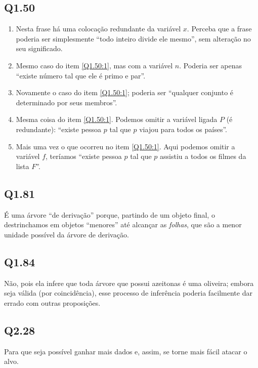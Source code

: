 \documentclass[portuguese,a4paper,12pt]{article}
\begin{document}
	\subsection*{Q1.50}
	
	\begin{enumerate}[label=(\arabic*)]
		\item \label{Q1.50:1} Nesta frase há uma colocação redundante da variável $x$. Perceba que a frase poderia ser simplesmente ``todo inteiro divide ele mesmo'', sem alteração no seu significado.
		\item Mesmo caso do item \ref{Q1.50:1}, mas com a variável $n$. Poderia ser apenas ``existe número tal que ele é primo e par''.
		\item Novamente o caso do item \ref{Q1.50:1}; poderia ser ``qualquer conjunto é determinado por seus membros''.
		\item Mesma coisa do item \ref{Q1.50:1}. Podemos omitir a variável ligada $P$ (é redundante): ``existe pessoa $p$ tal que $p$ viajou para todos os países''.
		\item Mais uma vez o que ocorreu no item \ref{Q1.50:1}. Aqui podemos omitir a variável $f$, teríamos ``existe pessoa $p$ tal que $p$ assistiu a todos os filmes da lista $F$''.
	\end{enumerate}
	
	\subsection*{Q1.81}
	
	É uma árvore ``de derivação'' porque, partindo de um objeto final, o destrinchamos em objetos ``menores'' até alcançar as \textit{folhas}, que são a menor unidade possível da árvore de derivação.
	
	\subsection*{Q1.84}
	
	Não, pois ela infere que toda árvore que possui azeitonas é uma oliveira; embora seja válida (por coincidência), esse processo de inferência poderia facilmente dar errado com outras proposições.
	
	\subsection*{Q2.28}
	
	Para que seja possível ganhar mais dados e, assim, se torne mais fácil atacar o alvo.
	
\end{document}
